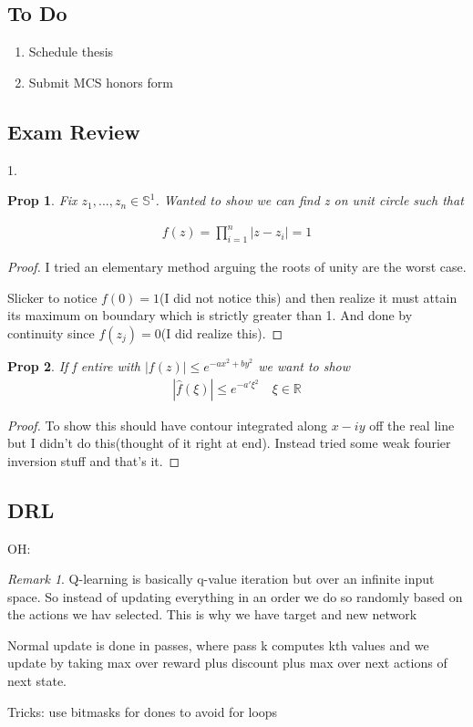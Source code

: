 \documentclass[11pt]{article}
\newcommand{\R}{\mathbb{R}}
\newtheorem{prop}{Prop}
\theoremstyle{remark}
\newtheorem{remark}{Remark}
\begin{document}
\subsection{To Do}

\begin{enumerate}
	\item Schedule thesis 
	\item Submit MCS honors form
\end{enumerate}

\subsection{Exam Review}

1. 
\begin{prop}
Fix $z_1,...,z_n \in \mathbb{S}^1$. Wanted to show we can find z on unit circle such that

\begin{align*}
	f(z) = \prod_{i=1}^n |z-z_i| = 1
\end{align*}

\end{prop}

\begin{proof}
	I tried an elementary method arguing the roots of unity are the worst case.

	Slicker to notice $f(0) = 1$(I did not notice this) and then realize it must attain its maximum on boundary which is strictly greater than 1. And done by continuity since $f(z_j) = 0$(I did realize this). 
\end{proof}

\begin{prop}
	If f entire with $|f(z)| \leq e^{-ax^2+by^2}$ we want to show
	\begin{align*}
		|\hat{f}(\xi)| \leq e^{-a'\xi^2} \quad \xi \in \R
	\end{align*}
\end{prop}

\begin{proof}
	To show this should have contour integrated along $x-iy$ off the real line but I didn't do this(thought of it right at end). Instead tried some weak fourier inversion stuff and that's it.
\end{proof}

\subsection{DRL}

OH:

\begin{remark}
	Q-learning is basically q-value iteration but over an infinite input space. So instead of updating everything in an order we do so randomly based on the actions we hav selected. This is why we have target and new network

	Normal update is done in passes, where pass k computes kth values and we update by taking max over reward plus discount plus max over next actions of next state.
\end{remark}

Tricks: use bitmasks for dones to avoid for loops
\end{document}
